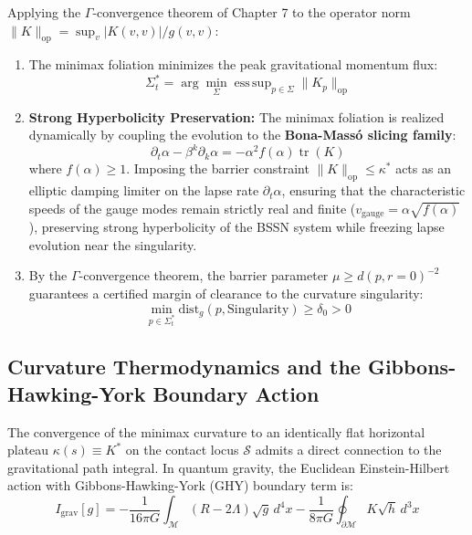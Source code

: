 \documentclass[11pt,reqno]{amsart}
\theoremstyle{definition}
\newcommand{\op}{\mathrm{op}}
\newcommand{\dist}{\mathrm{dist}}
\numberwithin{equation}{section}
\begin{document}
Applying the $\Gamma$-convergence theorem of Chapter 7 \cite{silvafilho2026minimax} to the operator norm $\|K\|_{\op} = \sup_{v} |K(v,v)| / g(v,v)$:
\begin{enumerate}
    \item The minimax foliation minimizes the peak gravitational momentum flux:
    \begin{equation}
    \Sigma_t^* = \arg\min_{\Sigma} \operatorname{ess\,sup}_{p \in \Sigma} \|K_p\|_{\op}
    \end{equation}
    \item \textbf{Strong Hyperbolicity Preservation:} The minimax foliation is realized dynamically by coupling the evolution to the \textbf{Bona-Mass\'o slicing family}:
    \begin{equation}
    \partial_t \alpha - \beta^k \partial_k \alpha = -\alpha^2 f(\alpha) \operatorname{tr}(K)
    \end{equation}
    where $f(\alpha) \ge 1$. Imposing the barrier constraint $\|K\|_{\op} \le \kappa^*$ acts as an elliptic damping limiter on the lapse rate $\partial_t \alpha$, ensuring that the characteristic speeds of the gauge modes remain strictly real and finite ($v_{\mathrm{gauge}} = \alpha \sqrt{f(\alpha)}$), preserving strong hyperbolicity of the BSSN system while freezing lapse evolution near the singularity.
    \item By the $\Gamma$-convergence theorem, the barrier parameter $\mu \ge d(p, r=0)^{-2}$ guarantees a certified margin of clearance to the curvature singularity:
    \begin{equation}
    \min_{p \in \Sigma_t^*} \dist_g(p, \text{Singularity}) \ge \delta_0 > 0
    \end{equation}
\end{enumerate}

\subsection{Curvature Thermodynamics and the Gibbons-Hawking-York Boundary Action}
\label{subsec:curvature_thermodynamics}
The convergence of the minimax curvature to an identically flat horizontal plateau $\kappa(s) \equiv K^*$ on the contact locus $\mathcal{S}$ admits a direct connection to the gravitational path integral.
In quantum gravity, the Euclidean Einstein-Hilbert action with Gibbons-Hawking-York (GHY) boundary term is:
\begin{equation}
I_{\mathrm{grav}}[g] = -\frac{1}{16\pi G} \int_{\mathcal{M}} (R - 2\Lambda) \sqrt{g} \, d^4x - \frac{1}{8\pi G} \oint_{\partial\mathcal{M}} K \sqrt{h} \, d^3x
\end{equation}
\end{document}
